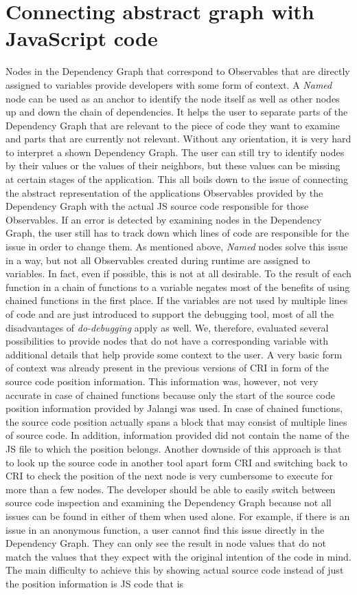 \section{Connecting abstract graph with JavaScript code}
Nodes in the Dependency Graph that correspond to Observables that are directly assigned to variables provide developers with some form of context. A \emph{Named} node can be used as an anchor to identify the node itself as well as other nodes up and down the chain of dependencies. It helps the user to separate parts of the Dependency Graph that are relevant to the piece of code they want to examine and parts that are currently not relevant. Without any orientation, it is very hard to interpret a shown Dependency Graph. The user can still try to identify nodes by their values or the values of their neighbors, but these values can be missing at certain stages of the application. This all boils down to the issue of connecting the abstract representation of the applications Observables provided by the Dependency Graph with the actual JS source code responsible for those Observables. If an error is detected by examining nodes in the Dependency Graph, the user still has to track down which lines of code are responsible for the issue in order to change them. As mentioned above, \emph{Named} nodes solve this issue in a way, but not all Observables created during runtime are assigned to variables. In fact, even if possible, this is not at all desirable. To the result of each function in a chain of functions to a variable negates most of the benefits of using chained functions in the first place. If the variables are not used by multiple lines of code and are just introduced to support the debugging tool, most of all the disadvantages of \emph{do-debugging} apply as well. We, therefore, evaluated several possibilities to provide nodes that do not have a corresponding variable with additional details that help provide some context to the user. A very basic form of context was already present in the previous versions of CRI in form of the source code position information. This information was, however, not very accurate in case of chained functions because only the start of the source code position information provided by Jalangi was used. In case of chained functions, the source code position actually spans a block that may consist of multiple lines of source code. In addition, information provided did not contain the name of the JS file to which the position belongs. Another downside of this approach is that to look up the source code in another tool apart form CRI and switching back to CRI to check the position of the next node is very cumbersome to execute for more than a few nodes. The developer should be able to easily switch between source code inspection and examining the Dependency Graph because not all issues can be found in either of them when used alone. For example, if there is an issue in an anonymous function, a user cannot find this issue directly in the Dependency Graph. They can only see the result in node values that do not match the values that they expect with the original intention of the code in mind. The main difficulty to achieve this by showing actual source code instead of just the position information is JS code that is 